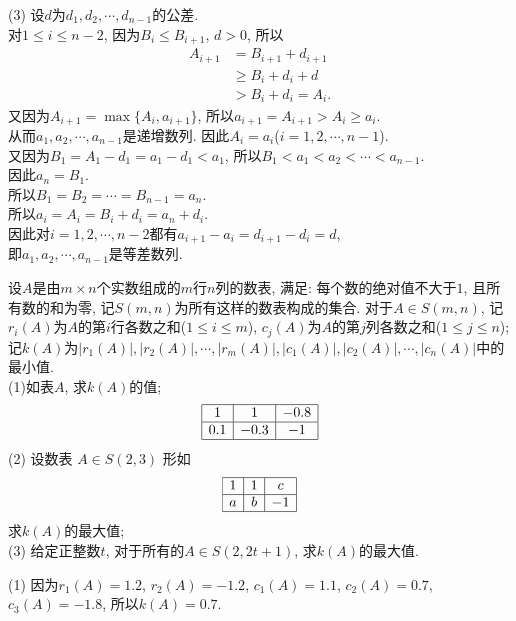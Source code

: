 \documentclass[green]{lsbook}
\begin{document}
(3) 设$d$为$d_1, d_2, \cdots, d_{n-1}$的公差. \\
对$1\leq i\leq n-2$, 因为$B_i\leq B_{i+1}$, $d>0$, 所以
\begin{align*}
A_{i+1}&=B_{i+1}+d_{i+1}\\
&\geq B_i+d_i+d\\
&>B_i+d_i=A_i.
\end{align*}
又因为$A_{i+1}=\max \{A_i,a_{i+1}\}$, 所以$a_{i+1}=A_{i+1}>A_i\geq a_i$.\\ 
从而$a_1,a_2,\cdots,a_{n-1}$是递增数列. 因此$A_i=a_i$($i=1,2,\cdots,n-1$). \\
又因为$B_1=A_1-d_1=a_1-d_1<a_1$, 所以$B_1<a_1<a_2 <\cdots <a_{n-1}$. \\
因此$a_n=B_1$. \\
所以$B_1=B_2=\cdots =B_{n-1}=a_n$. \\
所以$a_i=A_i=B_i+d_i=a_n+d_i$.\\ 
因此对$i=1,2,\cdots,n-2$都有$a_{i+1}-a_i=d_{i+1}-d_i=d$,\\ 
即$a_1,a_2,\cdots,a_{n-1}$是等差数列. 
\newpage


\begin{tcolorbox}[applelight,title={2012.理20(本小题13分)}]
	设$A$是由$m\times n$个实数组成的$m$行$n$列的数表, 满足: 每个数的绝对值不大于$1$, 且所有数的和为零, 记$S(m, n)$为所有这样的数表构成的集合. 对于$A\in S(m,n)$, 记$r_i(A)$为$A$的第$i$行各数之和($1\leq i\leq m$), $c_j(A)$为$A$的第$j$列各数之和($1\leq j\leq n$);\\
记$k(A)$为$|r_1(A)|,|r_2(A)|,\cdots,|r_m(A)|,|c_1(A)|,|c_2(A)|,\cdots, |c_n(A)|$中的最小值. \\
(1)如表$A$, 求$k(A)$的值;
$$\begin{array}{|c|c|c|}
\hline
	1 & 1 &-0.8\\
	\hline
	0.1&-0.3&-1\\
	\hline
\end{array}$$
 (2) 设数表 $A\in S(2, 3)$ 形如
 	$$\begin{array}{|c|c|c|}
 	\hline
 	 		1 & 1 &c\\
 	 		\hline
 	 		a&b&-1\\
 	 		\hline
 	 	\end{array}$$
求$k(A)$的最大值;\\
 (3) 给定正整数$t$, 对于所有的$A\in S(2, 2t+1)$, 求$k(A)$的最大值. 
\end{tcolorbox}
(1) 因为$r_1(A)=1.2$, $r_2(A)=-1.2$, $c_1(A)=1.1$, $c_2(A)=0.7$, $c_3(A)=-1.8$, 
所以$k(A)=0.7$. 
\end{document}
